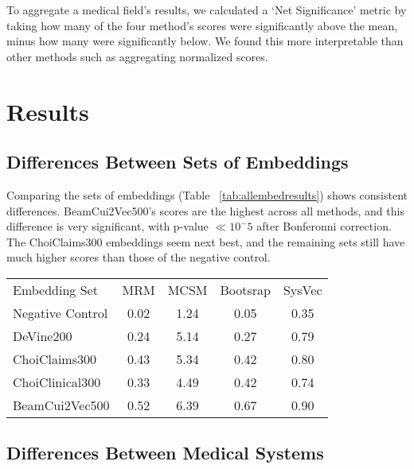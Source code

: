 \documentclass[11pt,a4paper]{article}
\begin{document}
To aggregate a medical field's results, we calculated a `Net Significance' metric by taking how many of the four method's scores were significantly above the mean, minus how many were significantly below. We found this more interpretable than other methods such as aggregating normalized scores. 


\section{Results}


\subsection{Differences Between Sets of Embeddings}
Comparing the sets of embeddings (Table ~\ref{tab:allembedresults}) shows consistent differences. BeamCui2Vec500's scores are the highest across all methods, and this difference is very significant, with p-value $\ll 10^-5$ after Bonferonni correction. The ChoiClaims300 embeddings seem next best, and the remaining sets still have much higher scores than those of the negative control. 


\begin{table*}[h]
	\begin{center}
		\begin{tabular}{lcccc}
			Embedding Set &MRM 	        &MCSM              &Bootsrap 	  &SysVec \\
			\hlineB{4}
			Negative Control& 0.02 & 1.24 & 0.05 & 0.35 \\
			\hline	            
			DeVine200       & 0.24 & 5.14 &	0.27 & 0.79 \\
			\hline
			ChoiClaims300   & 0.43 & 5.34 &	0.42 & 0.80 \\
			\hline 
			ChoiClinical300	& 0.33 & 4.49 &	0.42 & 0.74 \\
			\hline
			BeamCui2Vec500	& 0.52 & 6.39 & 0.67 & 0.90 \\
		\end{tabular}
		\caption{Mean scores for embedding sets for each evaluation method. See Methods section for abbreviations}
		\label{tab:allembedresults}
	\end{center}
	
\end{table*}


\subsection{Differences Between Medical Systems}
\end{document}
